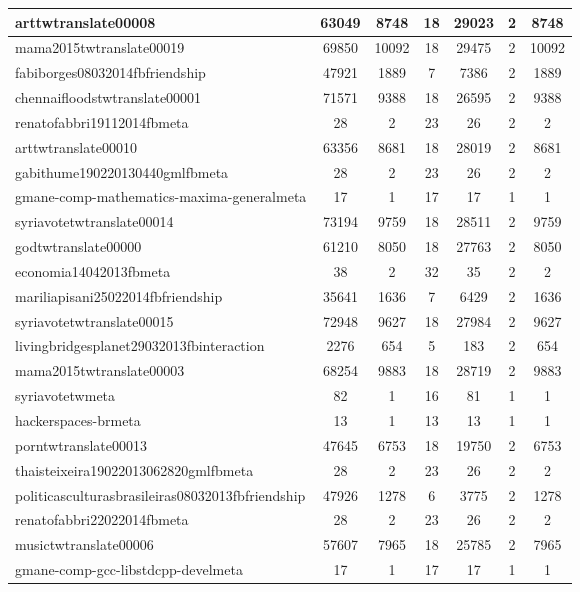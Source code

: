 \begin{table*}[h!]
\begin{center}
\begin{tabular}{| l | c | c | c | c | c | c |}
arttwtranslate00008 & 63049  & 8748  & 18  & 29023  & 2  & 8748 \\\hline
mama2015twtranslate00019 & 69850  & 10092  & 18  & 29475  & 2  & 10092 \\\hline
fabiborges08032014fbfriendship & 47921  & 1889  & 7  & 7386  & 2  & 1889 \\\hline
chennaifloodstwtranslate00001 & 71571  & 9388  & 18  & 26595  & 2  & 9388 \\\hline
renatofabbri19112014fbmeta & 28  & 2  & 23  & 26  & 2  & 2 \\\hline
arttwtranslate00010 & 63356  & 8681  & 18  & 28019  & 2  & 8681 \\\hline
gabithume190220130440gmlfbmeta & 28  & 2  & 23  & 26  & 2  & 2 \\\hline
gmane-comp-mathematics-maxima-generalmeta & 17  & 1  & 17  & 17  & 1  & 1 \\\hline
syriavotetwtranslate00014 & 73194  & 9759  & 18  & 28511  & 2  & 9759 \\\hline
godtwtranslate00000 & 61210  & 8050  & 18  & 27763  & 2  & 8050 \\\hline
economia14042013fbmeta & 38  & 2  & 32  & 35  & 2  & 2 \\\hline
mariliapisani25022014fbfriendship & 35641  & 1636  & 7  & 6429  & 2  & 1636 \\\hline
syriavotetwtranslate00015 & 72948  & 9627  & 18  & 27984  & 2  & 9627 \\\hline
livingbridgesplanet29032013fbinteraction & 2276  & 654  & 5  & 183  & 2  & 654 \\\hline
mama2015twtranslate00003 & 68254  & 9883  & 18  & 28719  & 2  & 9883 \\\hline
syriavotetwmeta & 82  & 1  & 16  & 81  & 1  & 1 \\\hline
hackerspaces-brmeta & 13  & 1  & 13  & 13  & 1  & 1 \\\hline
porntwtranslate00013 & 47645  & 6753  & 18  & 19750  & 2  & 6753 \\\hline
thaisteixeira19022013062820gmlfbmeta & 28  & 2  & 23  & 26  & 2  & 2 \\\hline
politicasculturasbrasileiras08032013fbfriendship & 47926  & 1278  & 6  & 3775  & 2  & 1278 \\\hline
renatofabbri22022014fbmeta & 28  & 2  & 23  & 26  & 2  & 2 \\\hline
musictwtranslate00006 & 57607  & 7965  & 18  & 25785  & 2  & 7965 \\\hline
gmane-comp-gcc-libstdcpp-develmeta & 17  & 1  & 17  & 17  & 1  & 1 \\\hline

\end{tabular}
\end{center}
\end{table*}
